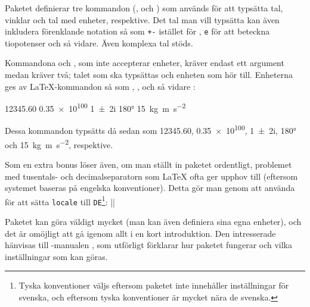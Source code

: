 \documentclass[lang=sv,ptsize=10pt,font=none,nomath,titles=bf,../../a4.tex]{subfiles}
\begin{document}
Paketet definierar tre kommandon (,  och ) som
används för att typsätta tal, vinklar och tal med enheter, respektive. Det
tal man vill typsätta kan även inkludera förenklande notation så som
\texttt{+-} istället för , \texttt{e} för att beteckna tiopotenser
och så vidare. Även komplexa tal stöds.

Kommandona  och , som inte accepterar enheter, kräver
endast ett argument medan  kräver två; talet som ska typsättas
och enheten som hör till. Enheterna ges av \LaTeX-kommandon så som
, ,  och så vidare
\parencite[en full lista ges av][\ppno~9–12]{Wright11}:
\begin{latexcode}
\num{12345,60} %
\num{.35e100} %
\num{1+-2i}   %
\ang{180}     %
\SI{15}{\kilogram\metre\per\second\squared} %
\end{latexcode}
Dessa kommandon typsätts då sedan som
\num{12345,60}, %
\num{.35e100}, %
\num{1+-2i},   %
\ang{180} och     %
\SI{15}{\kilogram\metre\per\second\squared},
respektive.

Som en extra bonus löser  även, om man ställt in paketet
ordentligt, problemet med tusentals- och decimalseparatorn som \LaTeX{}
ofta ger upphov till (eftersom systemet baseras på engelska konventioner).
Detta gör man genom att använda  för att sätta 
\texttt{locale} till \texttt{DE}\footnote{Tyska konventioner väljs 
eftersom  paketet inte innehåller inställningar för svenska, och eftersom 
tyska konventioner är mycket nära de svenska.}:
\latex||

Paketet kan göra väldigt mycket (man kan även definiera sina egna
enheter), och det är omöjligt att gå igenom allt i en kort introduktion.
Den intresserade hänvisas till -manualen \parencite{Wright11},
som utförligt förklarar hur paketet fungerar och vilka inställningar som
kan göras.
\end{document}
